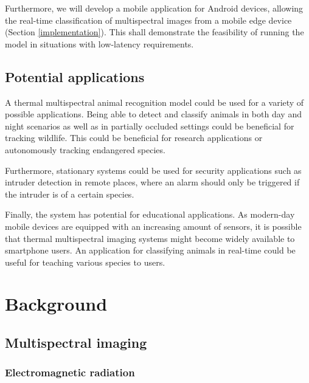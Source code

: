 \documentclass{l4proj}
\begin{document}
Furthermore, we will develop a mobile application for Android devices, allowing the real-time classification of multispectral images from a mobile edge device (Section \ref{implementation}). This shall demonstrate the feasibility of running the model in situations with low-latency requirements.


\section{Potential applications}

A thermal multispectral animal recognition model could be used for a variety of possible applications. Being able to detect and classify animals in both day and night scenarios as well as in partially occluded settings could be beneficial for tracking wildlife. This could be beneficial for research applications or autonomously tracking endangered species.

Furthermore, stationary systems could be used for security applications such as intruder detection in remote places, where an alarm should only be triggered if the intruder is of a certain species. 

Finally, the system has potential for educational applications. As modern-day mobile devices are equipped with an increasing amount of sensors, it is possible that thermal multispectral imaging systems might become widely available to smartphone users. An application for classifying animals in real-time could be useful for teaching various species to users.

\chapter{Background}
\label{background}

\section{Multispectral imaging}
\label{imaging}

\subsection{Electromagnetic radiation}
\end{document}
